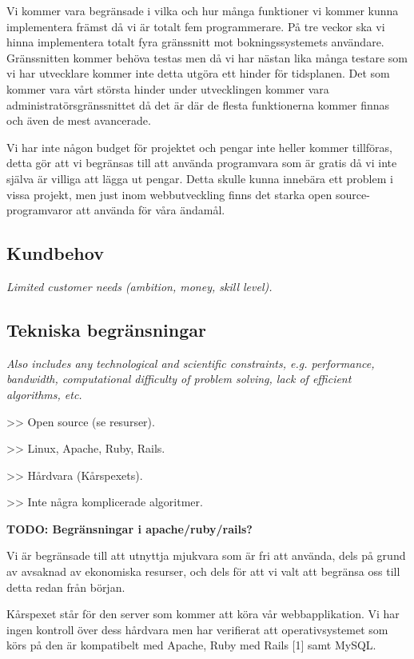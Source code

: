 \documentclass[a4paper, twoside, 11pt, titlepage]{article}
\begin{document}
	Vi kommer vara begränsade i vilka och hur många funktioner vi kommer kunna implementera främst då vi är totalt fem programmerare. På tre veckor ska vi hinna implementera totalt fyra gränssnitt mot bokningssystemets användare. Gränssnitten kommer behöva testas men då vi har nästan lika många testare som vi har utvecklare kommer inte detta utgöra ett hinder för tidsplanen. Det som kommer vara vårt största hinder under utvecklingen kommer vara administratörsgränssnittet då det är där de flesta funktionerna kommer finnas och även de mest avancerade.

	Vi har inte någon budget för projektet och pengar inte heller kommer tillföras, detta gör att vi begränsas till att använda programvara som är gratis då vi inte själva är villiga att lägga ut pengar. Detta skulle kunna innebära ett problem i vissa projekt, men just inom webbutveckling finns det starka open source-programvaror att använda för våra ändamål.

	\subsection{Kundbehov}

	\emph{Limited customer needs (ambition, money, skill level).}

	\subsection{Tekniska begränsningar}

	\emph{Also includes any technological and scientific constraints, e.g. performance, bandwidth, computational difficulty of problem solving, lack of efficient algorithms, etc.} 

	>> Open source (se resurser).

	>> Linux, Apache, Ruby, Rails.

	>> Hårdvara (Kårspexets).

	>> Inte några komplicerade algoritmer.

	 \textbf{TODO: Begränsningar i apache/ruby/rails?} 

	Vi är begränsade till att utnyttja mjukvara som är fri att använda, dels på grund av avsaknad av ekonomiska resurser, och dels för att vi valt att begränsa oss till detta redan från början.

	Kårspexet står för den server som kommer att köra vår webbapplikation. Vi har ingen kontroll över dess hårdvara men har verifierat att operativsystemet som körs på den är kompatibelt med Apache, Ruby med Rails [1] samt MySQL. 
\end{document}
